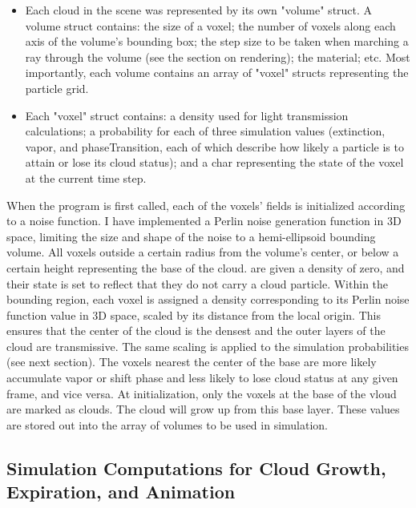 \documentclass{jcgt}
\begin{document}
\begin{itemize}
\item Each cloud in the scene was represented by its own "volume" struct. A volume struct
	  contains: the size of a voxel; the number of voxels along each axis of the volume's 
	  bounding box; the step size to be taken when marching a ray through the volume 
	  (see the section on rendering); the material; etc. Most importantly, each volume 
	  contains an array of "voxel" structs representing the particle grid.
\item Each "voxel" struct contains: a density used for light transmission calculations; a
	  probability for each of three simulation values (extinction, vapor, and
	  phaseTransition, each of which describe how likely a particle is to attain or lose
	  its cloud status); and a char representing the state of the voxel at the current
	  time step.  
\end{itemize}

\noindent
When the program is first called, each of the voxels' fields is initialized according to
a noise function. I have implemented a Perlin noise generation function in
3D space, limiting the size and shape of the noise to a hemi-ellipsoid bounding volume.
All voxels outside a certain radius from the volume's center, or below
a certain height representing the base of the cloud. are given a density of
zero, and their state is set to reflect that they do not carry a cloud particle. Within
the bounding region, each voxel is assigned a density corresponding to its Perlin noise 
function value in 3D space, scaled by its distance from the local origin. This ensures 
that the center of the cloud is the densest and the outer layers of the cloud are 
transmissive. The same scaling is applied to the simulation probabilities (see next 
section). The voxels nearest the center of the base are more likely accumulate vapor
or shift phase and less likely to lose cloud status at any given frame, and vice versa. 
At initialization, only the voxels at the base of the vloud are marked as clouds. The cloud
will grow up from this base layer. These values are stored out into the array of volumes 
to be used in simulation.

\subsection{Simulation Computations for Cloud Growth, Expiration, and Animation}
\end{document}
